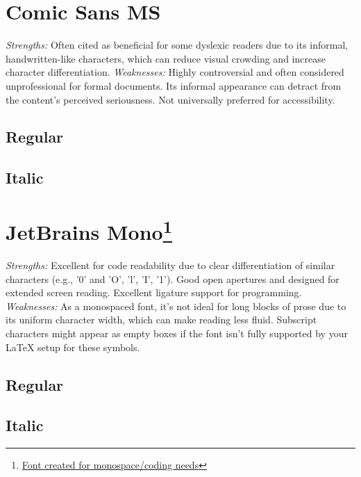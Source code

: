 \pagebreak
\section{Comic Sans MS}\label{trouble9}
\begin{raggedright}
\emph{Strengths:} Often cited as beneficial for some dyslexic readers due to its informal, handwritten-like characters, which can reduce visual crowding and increase character differentiation.
\emph{Weaknesses:} Highly controversial and often considered unprofessional for formal documents. Its informal appearance can detract from the content's perceived seriousness. Not universally preferred for accessibility.

\subsection{Regular}
\FontSample{\comicsansfont}

\subsection{Italic}
\FontSample{{\comicsansfont\itshape}}
\end{raggedright}


\pagebreak
\hypertarget{trouble10}{}\section[JetBrains Mono]{JetBrains Mono\footnote{\href{https://www.jetbrains.com/lp/mono/}{Font created for monospace/coding needs}}}\label{trouble10}
\begin{raggedright}
\emph{Strengths:} Excellent for code readability due to clear differentiation of similar characters (e.g., '0' and 'O', 'l', 'I', '1'). Good open apertures and designed for extended screen reading. Excellent ligature support for programming.
\emph{Weaknesses:} As a monospaced font, it's not ideal for long blocks of prose due to its uniform character width, which can make reading less fluid. Subscript characters might appear as empty boxes if the font isn't fully supported by your LaTeX setup for these symbols.

\subsection{Regular}
\FontSample{\jetbrainsmonofont}

\subsection{Italic}
\FontSample{{\jetbrainsmonofont\itshape}}
\end{raggedright}


